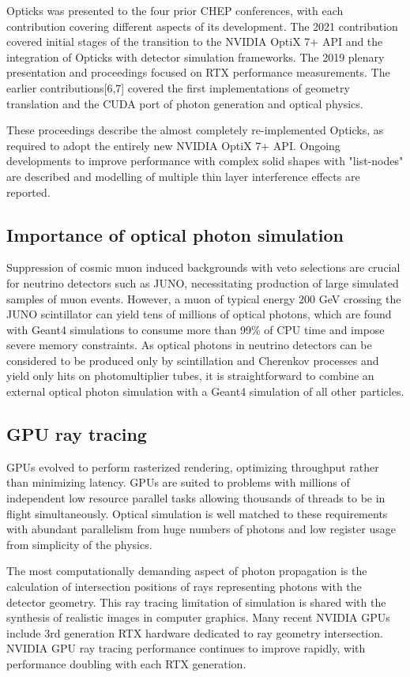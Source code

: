 \documentclass{webofc}
\begin{document}
Opticks was presented to the four prior CHEP conferences, with each contribution
covering different aspects of its development. The 2021 contribution\cite{chep2021} 
covered initial stages of the transition to the NVIDIA OptiX 7+ API and 
the integration of Opticks with detector simulation frameworks. 
The 2019 plenary presentation and proceedings\cite{chep2019} focused on RTX\cite{rtx} performance measurements.
The earlier contributions[6,7] covered the first 
implementations of geometry translation and the CUDA port of photon generation and optical physics.

These proceedings describe the almost completely re-implemented Opticks,
as required to adopt the entirely new NVIDIA OptiX 7+ API. 
Ongoing developments to improve performance with complex solid shapes with "list-nodes" are described
and modelling of multiple thin layer interference effects are reported. 
%
%
\subsection{Importance of optical photon simulation}%
%
%
Suppression of cosmic muon induced backgrounds with veto selections are crucial for neutrino
detectors such as JUNO\cite{juno}, necessitating production of large simulated samples of muon events. 
However, a muon of typical energy 200 GeV crossing the JUNO scintillator can yield tens of millions of 
optical photons, which are found with Geant4 simulations to consume more than 99\% of CPU time
and impose severe memory constraints.
%
As optical photons in neutrino detectors can be considered to be produced
only by scintillation and Cherenkov processes and yield only hits
on photomultiplier tubes, it is straightforward to combine an external optical photon simulation 
with a Geant4 simulation of all other particles.
%
\subsection{GPU ray tracing}%
%
GPUs evolved to perform rasterized rendering, optimizing throughput\cite{throughput} rather than minimizing latency.
GPUs are suited to problems with millions of independent low resource parallel tasks allowing thousands of threads 
to be in flight simultaneously.
Optical simulation is well matched to these requirements with abundant parallelism 
from huge numbers of photons and low register usage from simplicity of the physics.

The most computationally demanding aspect of photon propagation
is the calculation of intersection positions of rays representing photons with the detector geometry.
This ray tracing limitation of simulation is shared with the synthesis of realistic images in computer graphics. 
Many recent NVIDIA GPUs include 3rd generation RTX\cite{rtx} hardware dedicated to ray geometry intersection. 
NVIDIA GPU ray tracing performance continues to improve rapidly, with performance doubling  
with each RTX generation. 
%
%
\end{document}
